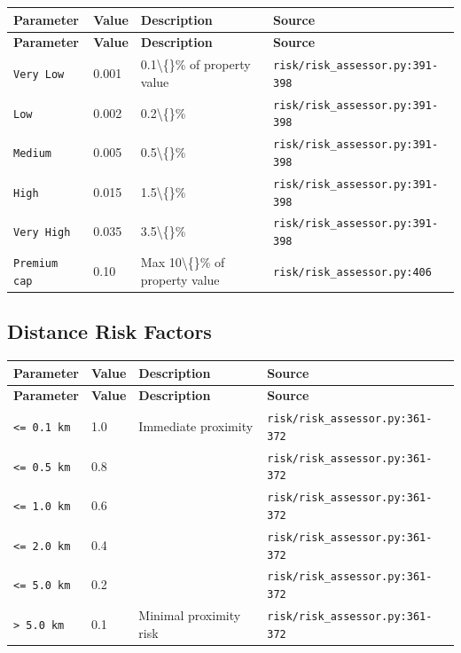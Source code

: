 \documentclass[11pt,a4paper]{article}
\begin{document}
\begin{longtable}{p{4cm}p{4cm}p{5.5cm}p{3.5cm}}
    \toprule
    \textbf{Parameter} & \textbf{Value} & \textbf{Description} & \textbf{Source} \\
    \midrule
    \endfirsthead
    \toprule
    \textbf{Parameter} & \textbf{Value} & \textbf{Description} & \textbf{Source} \\
    \midrule
    \endhead
    \bottomrule
    \endfoot
    \texttt{Very Low} & 0.001 & 0.1\textbackslash\{\}\% of property value & {\scriptsize \texttt{risk/risk\_assessor.py:391-398}} \\
    \texttt{Low} & 0.002 & 0.2\textbackslash\{\}\% & {\scriptsize \texttt{risk/risk\_assessor.py:391-398}} \\
    \texttt{Medium} & 0.005 & 0.5\textbackslash\{\}\% & {\scriptsize \texttt{risk/risk\_assessor.py:391-398}} \\
    \texttt{High} & 0.015 & 1.5\textbackslash\{\}\% & {\scriptsize \texttt{risk/risk\_assessor.py:391-398}} \\
    \texttt{Very High} & 0.035 & 3.5\textbackslash\{\}\% & {\scriptsize \texttt{risk/risk\_assessor.py:391-398}} \\
    \texttt{Premium cap} & 0.10 & Max 10\textbackslash\{\}\% of property value & {\scriptsize \texttt{risk/risk\_assessor.py:406}} \\
\end{longtable}

\subsection{Distance Risk Factors}

\begin{longtable}{p{4cm}p{4cm}p{5.5cm}p{3.5cm}}
    \toprule
    \textbf{Parameter} & \textbf{Value} & \textbf{Description} & \textbf{Source} \\
    \midrule
    \endfirsthead
    \toprule
    \textbf{Parameter} & \textbf{Value} & \textbf{Description} & \textbf{Source} \\
    \midrule
    \endhead
    \bottomrule
    \endfoot
    \texttt{<= 0.1 km} & 1.0 & Immediate proximity & {\scriptsize \texttt{risk/risk\_assessor.py:361-372}} \\
    \texttt{<= 0.5 km} & 0.8 &  & {\scriptsize \texttt{risk/risk\_assessor.py:361-372}} \\
    \texttt{<= 1.0 km} & 0.6 &  & {\scriptsize \texttt{risk/risk\_assessor.py:361-372}} \\
    \texttt{<= 2.0 km} & 0.4 &  & {\scriptsize \texttt{risk/risk\_assessor.py:361-372}} \\
    \texttt{<= 5.0 km} & 0.2 &  & {\scriptsize \texttt{risk/risk\_assessor.py:361-372}} \\
    \texttt{> 5.0 km} & 0.1 & Minimal proximity risk & {\scriptsize \texttt{risk/risk\_assessor.py:361-372}} \\
\end{longtable}
\end{document}
